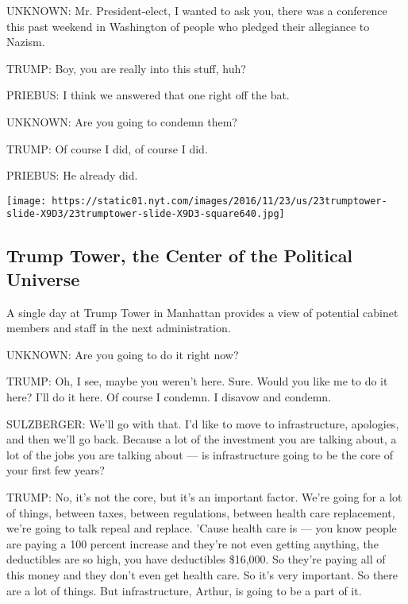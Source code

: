 UNKNOWN: Mr. President-elect, I wanted to ask you, there was a
conference this past weekend in Washington of people who pledged their
allegiance to Nazism.

TRUMP: Boy, you are really into this stuff, huh?

PRIEBUS: I think we answered that one right off the bat.

UNKNOWN: Are you going to condemn them?

TRUMP: Of course I did, of course I did.

PRIEBUS: He already did.

\href{https://www.nytimes.com/interactive/2016/11/23/us/politics/trump-tower.html}{}

\texttt{[image: https://static01.nyt.com/images/2016/11/23/us/23trumptower-slide-X9D3/23trumptower-slide-X9D3-square640.jpg]}

\hypertarget{trump-tower-the-center-of-the-political-universe}{%
\subsection{Trump Tower, the Center of the Political
Universe}\label{trump-tower-the-center-of-the-political-universe}}

A single day at Trump Tower in Manhattan provides a view of potential
cabinet members and staff in the next administration.

UNKNOWN: Are you going to do it right now?

TRUMP: Oh, I see, maybe you weren't here. Sure. Would you like me to do
it here? I'll do it here. Of course I condemn. I disavow and condemn.

SULZBERGER: We'll go with that. I'd like to move to infrastructure,
apologies, and then we'll go back. Because a lot of the investment you
are talking about, a lot of the jobs you are talking about --- is
infrastructure going to be the core of your first few years?

TRUMP: No, it's not the core, but it's an important factor. We're going
for a lot of things, between taxes, between regulations, between health
care replacement, we're going to talk repeal and replace. 'Cause health
care is --- you know people are paying a 100 percent increase and
they're not even getting anything, the deductibles are so high, you have
deductibles \$16,000. So they're paying all of this money and they don't
even get health care. So it's very important. So there are a lot of
things. But infrastructure, Arthur, is going to be a part of it.

